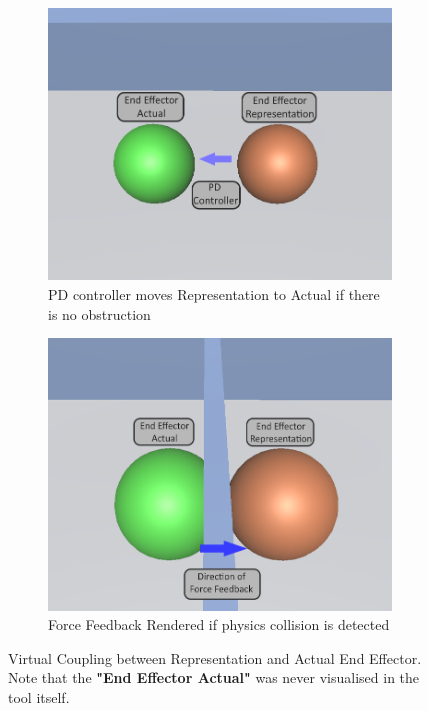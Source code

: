 \begin{figure}[htbp]
    \centering
    \begin{subfigure}[b]{0.4\textwidth}
        \centering
        \includegraphics[width=\textwidth]{images/approach-virtual-coupling-a.png}
        \caption{PD controller moves Representation to Actual if there is no obstruction}
        \label{fig:virtual-coupling-a}
    \end{subfigure}
    \quad
    \quad
    \begin{subfigure}[b]{0.4\textwidth}
        \centering
        \includegraphics[width=\textwidth]{images/approach-virtual-coupling-b.png}
        \caption{Force Feedback Rendered if physics collision is detected}
        \label{fig:virtual-coupling-b}
    \end{subfigure}
    \caption{Virtual Coupling between Representation and Actual End Effector. Note that the \textbf{"End Effector Actual"} was never visualised in the tool itself.}
    \label{fig:virtual-coupling}
\end{figure}

